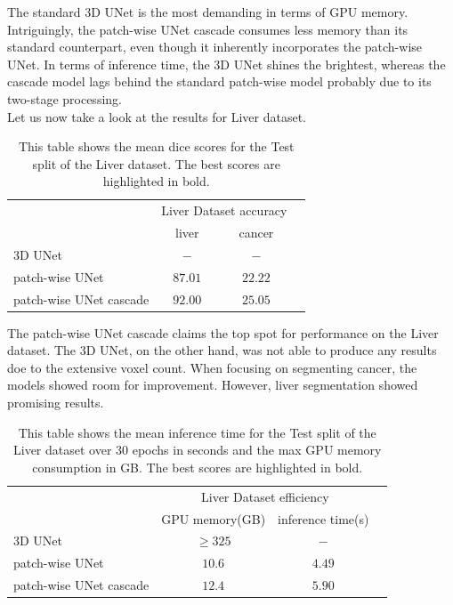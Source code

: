 The standard 3D UNet is the most demanding in terms of GPU memory. Intriguingly, the patch-wise UNet cascade consumes less memory than its standard counterpart,
even though it inherently incorporates the patch-wise UNet. In terms of inference time, the 3D UNet shines the brightest, whereas the cascade model lags behind the standard patch-wise model probably due to its two-stage processing.\\[1ex]
Let us now take a look at the results for Liver dataset.

\begin{table}[ht!]
\begin{center} {\footnotesize
\begin{tabular}{lccc}
\hline
	& \multicolumn{2}{c}{Liver Dataset accuracy} \\
	& \multicolumn{1}{c}{liver} & \multicolumn{1}{c}{cancer} \\
\hline
3D UNet & $-$ & $-$ \\[1ex]
patch-wise UNet & $87.01$ & $22.22$ \\[1ex]
patch-wise UNet cascade & $\mathbf{92.00}$ & $\mathbf{25.05}$ \\[1ex]
\hline
\end{tabular} }
\end{center}
\caption{\footnotesize This table shows the mean dice scores for the Test split of the Liver dataset. The best scores are highlighted in bold.}
\label{turns}
\end{table}

The patch-wise UNet cascade claims the top spot for performance on the Liver dataset. The 3D UNet, on the other hand, was not able to produce any results doe to the extensive voxel count.
When focusing on segmenting cancer, the models showed room for improvement. However, liver segmentation showed promising results.

\begin{table}[ht!]
\begin{center} {\footnotesize
\begin{tabular}{lccc}
\hline
	& \multicolumn{2}{c}{Liver Dataset efficiency} \\
	& \multicolumn{1}{c}{GPU memory(GB)} & \multicolumn{1}{c}{inference time(s)} \\
\hline
3D UNet & $\geq325$ & $-$ \\[1ex]
patch-wise UNet & $\mathbf{10.6}$ & $\mathbf{4.49}$ \\[1ex]
patch-wise UNet cascade & $12.4$ & $5.90$\\[1ex]
\hline
\end{tabular} }
\end{center}
\caption{\footnotesize This table shows the mean inference time for the Test split of the Liver dataset over 30 epochs in seconds and the max GPU memory consumption in GB. The best scores are highlighted in bold.}
\label{turns}
\end{table}

